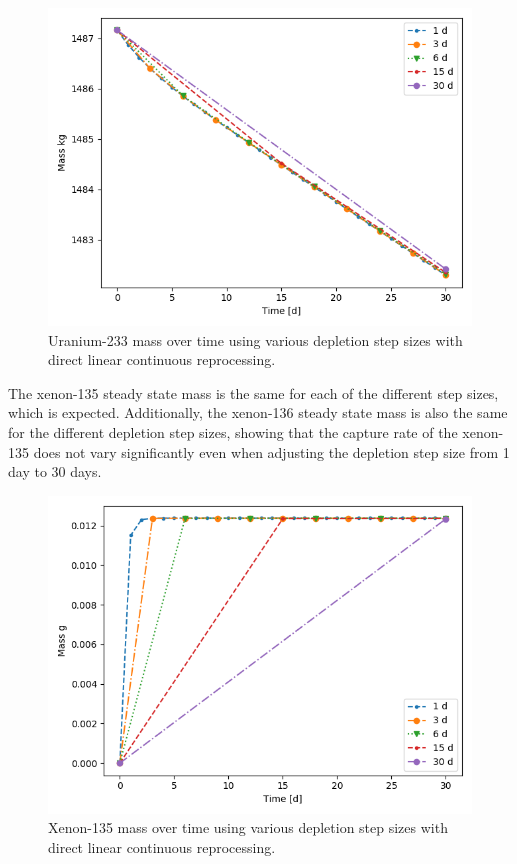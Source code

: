 \begin{figure}[H]
  \centering
  \includegraphics[scale=0.7]{images/DL_NSTEP_U-233_mass.png}
  \caption{Uranium-233 mass over time using various depletion step sizes with direct linear continuous reprocessing.}
   \label{fig:DL-cont-u}
\end{figure}

The xenon-135 steady state mass is the same for each of the different step sizes, which is expected. Additionally, the xenon-136 steady state mass is also the same for the different depletion step sizes, showing that the capture rate of the xenon-135 does not vary significantly even when adjusting the depletion step size from 1 day to 30 days.

\begin{figure}[H]
  \centering
  \includegraphics[scale=0.7]{images/DL_NSTEP_Xe-135_mass.png}
  \caption{Xenon-135 mass over time using various depletion step sizes with direct linear continuous reprocessing.}
   \label{fig:DL-cont-xe135}
\end{figure}

